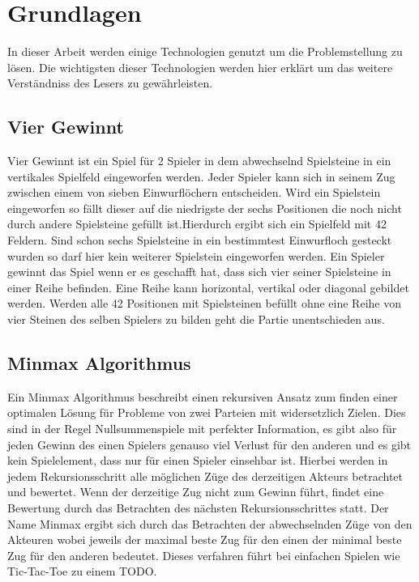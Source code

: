 \chapter{Grundlagen}%

\label{cha:Schluss}

In dieser Arbeit werden einige Technologien genutzt um die Problemstellung zu lösen.
Die wichtigsten dieser Technologien werden hier erklärt um das weitere Verständniss des Lesers zu gewährleisten. 


\section{Vier Gewinnt}
Vier Gewinnt ist ein Spiel für 2 Spieler in dem abwechselnd Spielsteine in ein vertikales Spielfeld eingeworfen werden. Jeder Spieler kann sich in seinem Zug zwischen einem von sieben Einwurflöchern entscheiden. Wird ein Spielstein eingeworfen so fällt dieser auf die niedrigste der sechs Positionen die noch nicht durch andere Spielsteine gefüllt ist.Hierdurch ergibt sich ein Spielfeld mit 42 Feldern.  Sind schon sechs Spielsteine in ein bestimmtest Einwurfloch gesteckt wurden so darf hier kein weiterer Spielstein eingeworfen werden. Ein Spieler gewinnt das Spiel wenn er es geschafft  hat, dass sich vier seiner Spielsteine in einer Reihe befinden. Eine Reihe kann horizontal, vertikal oder diagonal gebildet werden. Werden alle 42 Positionen mit Spielsteinen befüllt ohne eine Reihe von vier Steinen des selben Spielers zu bilden geht die Partie unentschieden aus.


\section{Minmax Algorithmus}
Ein Minmax Algorithmus beschreibt einen rekursiven Ansatz zum finden einer optimalen Lösung für Probleme von zwei Parteien mit widersetzlich Zielen. Dies sind in der Regel Nullsummenspiele mit perfekter Information, es gibt also für jeden Gewinn des einen Spielers genauso viel Verlust für den anderen und es gibt kein Spielelement, dass nur für einen Spieler einsehbar ist. Hierbei werden in jedem Rekursionsschritt alle möglichen Züge des derzeitigen Akteurs betrachtet und bewertet. Wenn der derzeitige Zug nicht zum Gewinn führt, findet eine Bewertung durch das Betrachten des nächsten Rekursionsschrittes statt. Der Name Minmax ergibt sich durch das Betrachten der abwechselnden Züge von den Akteuren wobei jeweils der maximal beste Zug für den einen der minimal beste Zug für den anderen bedeutet.  Dieses verfahren führt bei einfachen Spielen wie Tic-Tac-Toe zu einem \colorbox{red!30}{TODO}.\\

